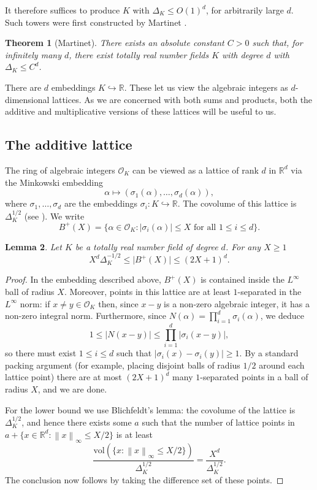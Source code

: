 \documentclass{amsart}
\numberwithin{equation}{section}
\newcommand{\abs}[1]{\mathopen{}\left| #1\mathclose{}\right|}
\newcommand{\norm}[1]{\mathopen{}\left\| #1\mathclose{}\right\|}
\newcommand{\bbr}{\mathbb{R}}
\newcommand{\Abs}[1]{\lvert #1\rvert}
\newtheorem{theorem}{Theorem}[section]
\newtheorem{lemma}[theorem]{Lemma}
\begin{document}
It therefore suffices to produce $K$ with $\Delta_K\leq O(1)^d$, for arbitrarily large $d$. Such towers were first constructed by Martinet \cite{Ma78}.

\begin{theorem}[Martinet]\label{th-tower}
There exists an absolute constant $C>0$ such that, for infinitely many $d$, there exist totally real number fields $K$ with degree $d$ with $\Delta_K\leq C^d$.
\end{theorem}

There are $d$ embeddings $K\hookrightarrow \bbr$. These let us view the algebraic integers as $d$-dimensional lattices. As we are concerned with both sums and products, both the additive and multiplicative versions of these lattices will be useful to us.
\subsection{The additive lattice}
The ring of algebraic integers $\mathcal{O}_K$ can be viewed as a lattice of rank $d$ in $\bbr^d$ via the Minkowski embedding
\[\alpha \mapsto (\sigma_1(\alpha),\ldots,\sigma_d(\alpha)),\]
where $\sigma_1,\ldots,\sigma_d$ are the embeddings $\sigma_i\colon K\hookrightarrow \bbr$. The covolume of this lattice is $\Delta_K^{1/2}$ (see \cite[V, Lemma 2]{La70}). We write 
\[B^+(X) = \{ \alpha \in \mathcal{O}_K : \abs{\sigma_i(\alpha)}\leq X\textrm{ for all }1\leq i\leq d\}.\]
\begin{lemma}\label{lem-ball}
Let $K$ be a totally real number field of degree $d$. For any $X\geq 1$
\[X^{d}\Delta_K^{-1/2}\leq \Abs{B^+(X)}\leq (2X+1)^{d}.\] 
\end{lemma}
\begin{proof}
In the embedding described above, $B^+(X)$ is contained inside the $L^\infty$ ball of radius $X$. Moreover, points in this lattice are at least $1$-separated in the $L^\infty$ norm: if $x\neq y\in \mathcal{O}_K$ then, since $x-y$ is a non-zero algebraic integer, it has a non-zero integral norm. Furthermore, since $N(\alpha)=\prod_{i=1}^d \sigma_i(\alpha)$, we deduce
\[1\leq \Abs{N(x-y)}\leq \prod_{i=1}^d\Abs{\sigma_i(x-y)},\]
so there must exist $1\leq i\leq d$ such that $\Abs{\sigma_i(x)-\sigma_i(y)}\geq 1$. By a standard packing argument (for example, placing disjoint balls of radius $1/2$ around each lattice point) there are at most $(2X+1)^{d}$ many $1$-separated points in a ball of radius $X$, and we are done.

For the lower bound we use Blichfeldt's lemma: the covolume of the lattice is $\Delta_K^{1/2}$, and hence there exists some $a$ such that the number of lattice points in $a+\{ x\in \bbr^d : \norm{x}_\infty \leq X/2\}$ is at least
\[\frac{\mathrm{vol}(\{ x: \norm{x}_\infty \leq X/2\})}{\Delta_K^{1/2}}= \frac{X^{d}}{\Delta_K^{1/2}}.\]
The conclusion now follows by taking the difference set of these points.
\end{proof}
\end{document}
